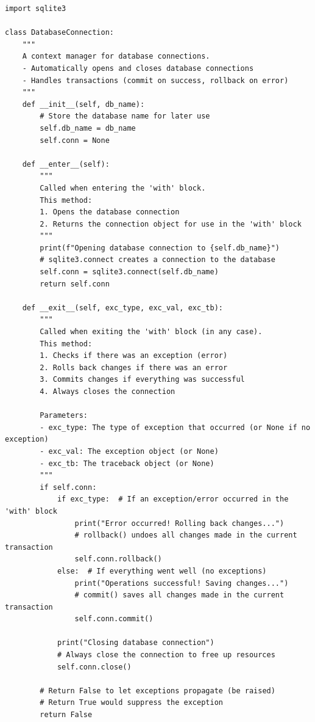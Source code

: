 \documentclass[12pt,letterpaper]{article}
\newenvironment{macterminal}{%
    \begin{mdframed}[
        linecolor=terminalFrame,
        backgroundcolor=terminalBg,
        roundcorner=5pt,
        skipabove=10pt,
        skipbelow=10pt,
        linewidth=1pt,
        innertopmargin=10pt, %
        frametitle={%
            \tikz[baseline=(current bounding box.east), outer sep=0pt]{
                \fill[red!80!black] (0,0) circle (5pt);
                \fill[yellow!80!black] (0.7,0) circle (5pt);
                \fill[green!70!black] (1.4,0) circle (5pt);
            }
        },
        frametitlealignment=\raggedright, %
        frametitleaboveskip=8pt, %
        frametitlebelowskip=0pt, %
    ]
}{%
    \end{mdframed}%
}
\begin{document}
\begin{macterminal}
\begin{lstlisting}
import sqlite3

class DatabaseConnection:
    """
    A context manager for database connections.
    - Automatically opens and closes database connections
    - Handles transactions (commit on success, rollback on error)
    """
    def __init__(self, db_name):
        # Store the database name for later use
        self.db_name = db_name  
        self.conn = None
        
    def __enter__(self):
        """
        Called when entering the 'with' block.
        This method:
        1. Opens the database connection
        2. Returns the connection object for use in the 'with' block
        """
        print(f"Opening database connection to {self.db_name}")
        # sqlite3.connect creates a connection to the database
        self.conn = sqlite3.connect(self.db_name)
        return self.conn
        
    def __exit__(self, exc_type, exc_val, exc_tb):
        """
        Called when exiting the 'with' block (in any case).
        This method:
        1. Checks if there was an exception (error)
        2. Rolls back changes if there was an error
        3. Commits changes if everything was successful
        4. Always closes the connection
        
        Parameters:
        - exc_type: The type of exception that occurred (or None if no exception)
        - exc_val: The exception object (or None)
        - exc_tb: The traceback object (or None)
        """
        if self.conn:
            if exc_type:  # If an exception/error occurred in the 'with' block
                print("Error occurred! Rolling back changes...")
                # rollback() undoes all changes made in the current transaction
                self.conn.rollback()
            else:  # If everything went well (no exceptions)
                print("Operations successful! Saving changes...")
                # commit() saves all changes made in the current transaction
                self.conn.commit()
                
            print("Closing database connection")
            # Always close the connection to free up resources
            self.conn.close()
            
        # Return False to let exceptions propagate (be raised)
        # Return True would suppress the exception
        return False


\end{lstlisting}
\end{macterminal}
\end{document}
